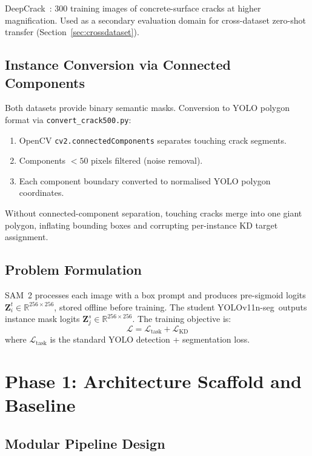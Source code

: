 \documentclass[12pt,a4paper]{article}
\newcommand{\yolo}{YOLOv11n-seg}
\begin{document}
DeepCrack~\cite{liu2019deepcrack}: 300 training images of concrete-surface
cracks at higher magnification.
Used as a secondary evaluation domain for cross-dataset zero-shot transfer
(Section~\ref{sec:crossdataset}).

\subsection{Instance Conversion via Connected Components}

Both datasets provide binary semantic masks.
Conversion to YOLO polygon format via \texttt{convert\_crack500.py}:
\begin{enumerate}
  \item OpenCV \texttt{cv2.connectedComponents} separates touching crack
    segments.
  \item Components $<50$ pixels filtered (noise removal).
  \item Each component boundary converted to normalised YOLO polygon
    coordinates.
\end{enumerate}
Without connected-component separation, touching cracks merge into one giant
polygon, inflating bounding boxes and corrupting per-instance KD target
assignment.

\subsection{Problem Formulation}

SAM~2 processes each image with a box prompt and produces pre-sigmoid logits
$\mathbf{Z}^t_i \in \mathbb{R}^{256\times256}$, stored offline before training.
The student \yolo\ outputs instance mask logits
$\mathbf{Z}^s_j\in\mathbb{R}^{256\times256}$.
The training objective is:
\[
\mathcal{L} = \mathcal{L}_\text{task} + \mathcal{L}_\text{KD}
\]
where $\mathcal{L}_\text{task}$ is the standard YOLO detection + segmentation
loss.

\section{Phase 1: Architecture Scaffold and Baseline}
\label{sec:phase1}

\subsection{Modular Pipeline Design}
\end{document}
